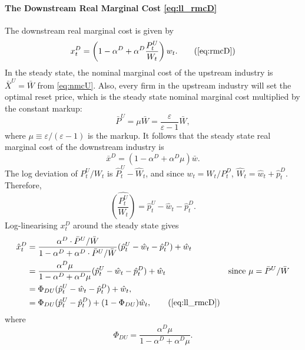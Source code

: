 \documentclass[a4paper, 12pt]{article}
\theoremstyle{definition*}
\begin{document}
\paragraph{The Downstream Real Marginal Cost \eqref{eq:ll_rmcD}}
The downstream real marginal cost is given by
\begin{equation}
  x^D_t = \left(1 - \alpha^D + \alpha^D\frac{P^U_t}{W_t}\right)w_t. \tag{\ref{eq:rmcD}}
\end{equation}
In the steady state, the nominal marginal cost of the upstream industry is $\bar X^U = \bar W$ from \eqref{eq:nmcU}.
Also, every firm in the upstream industry will set the optimal reset price, which is the steady state nominal marginal cost multiplied by the constant markup:
\begin{equation*}
  \bar P^U = \mu \bar W = \frac{\varepsilon}{\varepsilon - 1} \bar W,
\end{equation*}
where $\mu \equiv \varepsilon / (\varepsilon - 1)$ is the markup.
It follows that the steady state real marginal cost of the downstream industry is
\begin{equation*}
  \bar x^D = (1 - \alpha^D + \alpha^D\mu)\bar w.
\end{equation*}
The log deviation of $P^U_t / W_t$ is $\hat P^U_t - \hat W_t$, and since $w_t = W_t / P^D_t$, $\hat W_t = \hat w_t + \hat p^D_t$.
Therefore,
\begin{equation*}
  \widehat{\left(\frac{P^U_t}{W_t}\right)} = \hat p^U_t - \hat w_t - \hat p^D_t.
\end{equation*}
Log-linearising $x^D_t$ around the steady state gives
\begin{align*}
  \hat x^D_t &= \frac{\alpha^D\cdot \bar P^U / \bar W}{1 - \alpha^D + \alpha^D\cdot \bar P^U / \bar W}(\hat p^U_t - \hat w_t - \hat p^D_t) + \hat w_t \\
             &= \frac{\alpha^D\mu}{1 - \alpha^D + \alpha^D\mu}(\hat p^U_t - \hat w_t - \hat p^D_t) + \hat w_t &\text{since $\mu = \bar P^U / \bar W$} \\
             &= \Phi_{DU}(\hat p^U_t - \hat w_t - \hat p^D_t) + \hat w_t, \\
             &= \Phi_{DU}(\hat p^U_t - \hat p^D_t) + (1 - \Phi_{DU})\hat w_t, \tag{\ref{eq:ll_rmcD}}
\end{align*}
where
\begin{equation*}
  \Phi_{DU} = \frac{\alpha^D\mu}{1 - \alpha^D + \alpha^D\mu}.
\end{equation*}
\end{document}
